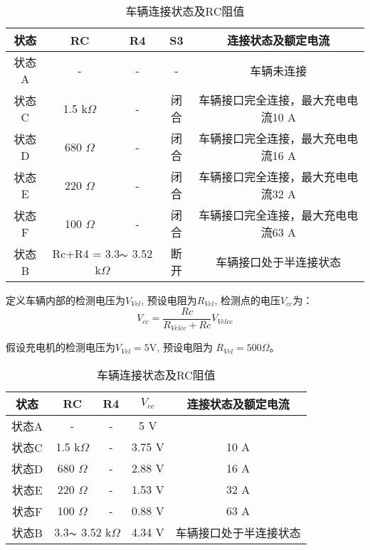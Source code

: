         \begin{table}[!htbp]
            \renewcommand{\arraystretch}{1.3}
            \centering
            \caption{车辆连接状态及RC阻值}
            \begin{tabular}{ccccc}   
                 \toprule
                 状态  & RC  & R4 & S3 & 连接状态及额定电流\\    
                 \midrule
                 状态A  & -  & - & - &  车辆未连接 \\
                 状态C  & 1.5 k$\Omega$  & - & 闭合 &  车辆接口完全连接，最大充电电流10 A \\
                 状态D  & 680 $\Omega$  & - &  闭合 &  车辆接口完全连接，最大充电电流16 A  \\
                 状态E  & 220 $\Omega$ & - &   闭合 &  车辆接口完全连接，最大充电电流32 A  \\
                 状态F  & 100 $\Omega$ & - &   闭合 &  车辆接口完全连接，最大充电电流63 A  \\
                 状态B  & \multicolumn{2}{c}{Rc+R4 = 3.3$\thicksim$ 3.52 k$\Omega$} & 断开 &车辆接口处于半连接状态\\
                 \bottomrule
            \end{tabular}
            \label{tab:RC1}
       \end{table}
       定义车辆内部的检测电压为$V_{Vel}$, 预设电阻为$R_{Vel}$, 检测点的电压$V_{cc}$为：
            \begin{equation}
                V_{cc} = \frac{Rc}{R_{Velcc}+Rc} V_{Velcc}
            \end{equation}

       \begin{example}
         假设充电机的检测电压为$V_{Vel} = 5 \mathrm{V}$, 预设电阻为 $R_{Vel} = 500 \Omega$。
         \begin{table}[h]
            \renewcommand{\arraystretch}{1.3}
            \centering
            \caption{车辆连接状态及RC阻值}
            \begin{tabular}{ccccc}   
                 \toprule
                 状态  & RC  & R4 & $V_{cc}$ & 连接状态及额定电流\\    
                 \midrule
                 状态A  & -  & - & 5 V &   \\
                 状态C  & 1.5 k$\Omega$  & - & 3.75 V &  10 A \\
                 状态D  & 680 $\Omega$  & - &  2.88 V &  16 A  \\
                 状态E  & 220 $\Omega$ & - &   1.53 V &  32 A  \\
                 状态F  & 100 $\Omega$ & - &   0.88 V &  63 A  \\
                 状态B  & \multicolumn{2}{c}{3.3$\thicksim$ 3.52 k$\Omega$} & 4.34 V &车辆接口处于半连接状态\\
                 \bottomrule
            \end{tabular}
            \label{tab:RC1}
       \end{table}
       \end{example}


